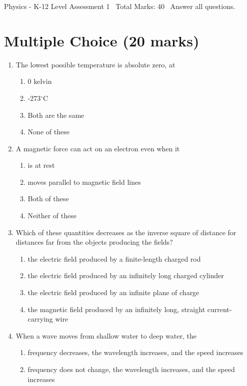 \documentclass[12pt]{article}
\begin{document}
\begin{center}
Physics - K-12 Level Assessment 1 \
Total Marks: 40 \
Answer all questions.
\end{center}

\section*{Multiple Choice (20 marks)}
\begin{enumerate}[label=\arabic*.]
\item The lowest possible temperature is absolute zero, at
\begin{enumerate}[label=(\alph*)]
    \item 0 kelvin
    \item -273$^\circ$C
    \item Both are the same
    \item None of these
\end{enumerate}
\item A magnetic force can act on an electron even when it
\begin{enumerate}[label=(\alph*)]
    \item is at rest
    \item moves parallel to magnetic field lines
    \item Both of these
    \item Neither of these
\end{enumerate}
\item Which of these quantities decreases as the inverse square of distance for distances far from the objects producing the fields?
\begin{enumerate}[label=(\alph*)]
    \item the electric field produced by a finite-length charged rod
    \item the electric field produced by an infinitely long charged cylinder
    \item the electric field produced by an infinite plane of charge
    \item the magnetic field produced by an infinitely long, straight current-carrying wire
\end{enumerate}
\item When a wave moves from shallow water to deep water, the
\begin{enumerate}[label=(\alph*)]
    \item frequency decreases, the wavelength increases, and the speed increases
    \item frequency does not change, the wavelength increases, and the speed increases

\end{enumerate}
\end{enumerate}
\end{document}
